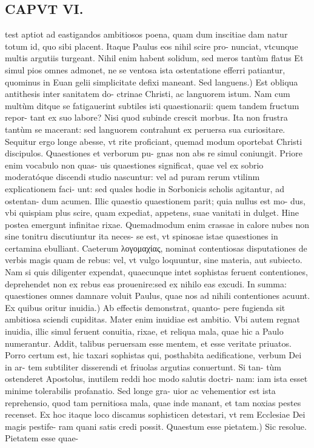 \documentclass{article}
\begin{document}
\begin{pages}
\section*{CAPVT VI. }
\marginpar{[ p.75 ]}\pstart test aptiot ad eastigandos ambitiosos poena, quam dum inscitiae dam natur totum id, quo sibi placent. Itaque Paulus eos nihil scire pro- nunciat, vtcunque multis argutiis turgeant. Nihil enim habent solidum, sed meros tantùm flatus Et simul pios omnes admonet, ne se ventosa ista ostentatione efferri patiantur, quominus in Euan gelii simplicitate defixi maneant.  \pend\pstart Sed languens.) Est obliqua antithesis inter sanitatem do- ctrinae Christi, ac languorem istum. Nam cum multùm ditque se fatigauerint subtiles isti quaestionarii: quem tandem fructum repor- tant ex suo labore? Nisi quod subinde crescit morbus. Ita non frustra tantùm se macerant: sed languorem contrahunt ex peruersa sua curiositare. Sequitur ergo longe abesse, vt rite proficiant, quemad modum oportebat Christi discipulos. Quaestiones et verborum pu- gnas non abs re simul coniungit. Priore enim vocabulo non quas- uis quaestiones significat, quae vel ex sobrio moderatóque discendi studio nascuntur: vel ad puram rerum vtilinm explicationem faci- unt: sed quales hodie in Sorbonicis scholis agitantur, ad ostentan- dum acumen. Illic quaestio quaestionem parit; quia nullus est mo- dus, vbi quispiam plus scire, quam expediat, appetens, suae vanitati in dulget. Hine postea emergunt infinitae rixae. Quemadmodum enim crassae in calore nubes non sine tonitru discutiuntur ita neces- se est, vt spinosae istae quaestiones in certamina ebulliant. Caeterum λογομαχίας, nominat contentiosas disputationes de verbis magis quam de rebus: vel, vt vulgo loquuntur, sine materia, aut subiecto. Nam si quis diligenter expendat, quaecunque intet sophistas feruent contentiones, deprehendet non ex rebus eas prouenire:sed ex nihilo eas excudi. In summa: quaestiones omnes damnare voluit Paulus, quae nos ad nihili contentiones acuunt.  \pend\pstart Ex quibus oritur inuidia.) Ab effectis demonstrat, quanto- pere fugienda sit ambitiosa sciendi cupiditas. Mater enim inuidiae est ambitio. Vbi autem regnat inuidia, illic simul feruent conuitia, rixae, et reliqua mala, quae hic a Paulo numerantur. Addit, talibus peruersam esse mentem, et esse veritate priuatos. Porro certum est, hic taxari sophistas qui, posthabita aedificatione, verbum Dei in ar- tem subtiliter disserendi et friuolas argutias conuertunt. Si tan- tùm ostenderet Apostolus, inutilem reddi hoc modo salutis doctri- nam: iam ista esset minime tolerabilis profanatio. Sed longe gra- uior ac vehementior est ista reprehensio, quod tam pernitiosa mala, quae inde manant, et tam noxias pestes recenset. Ex hoc itaque loco discamus sophisticen detestari, vt rem Ecclesiae Dei magis pestife- ram quani satis credi possit.  \pend\pstart Quaestum esse pietatem.) Sic resolue. Pietatem esse quae-  \pend

\end{pages}
\end{document}
